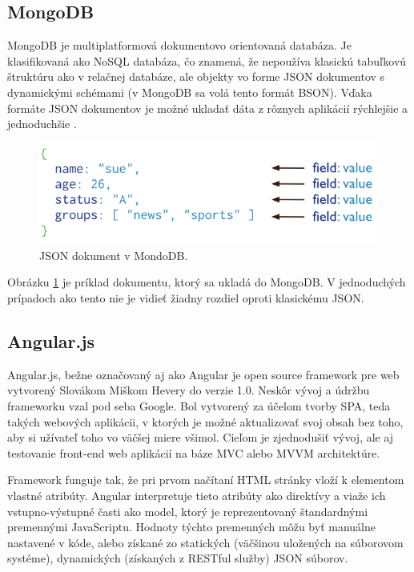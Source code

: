 \subsection{MongoDB}
MongoDB je multiplatformová dokumentovo orientovaná databáza. Je klasifikovaná ako NoSQL databáza, čo znamená, že nepoužíva klasickú tabuľkovú štruktúru ako v relačnej databáze, ale objekty vo forme JSON dokumentov s dynamickými schémami (v MongoDB sa volá tento formát BSON). Vďaka formáte JSON dokumentov je možné ukladať dáta z rôznych aplikácií rýchlejšie a jednoduchšie \cite{mongodb-wiki}.

\begin{figure}[H]
  \centering
  \includegraphics[scale=0.7]{img/mongodb/crud-annotated-document.png}
  \caption{JSON dokument v MondoDB.}
  \label{mongodb-example}
\end{figure}

Obrázku \ref{mongodb-example} je príklad dokumentu, ktorý sa ukladá do MongoDB. V jednoduchých prípadoch ako tento nie je vidieť žiadny rozdiel oproti klasickému JSON.

\subsection{Angular.js}
Angular.js, bežne označovaný aj ako Angular je open source framework pre web vytvorený Slovákom Miškom Hevery do verzie 1.0. Neskôr vývoj a údržbu frameworku vzal pod seba Google. Bol vytvorený za účelom tvorby SPA, teda takých webových aplikácii, v ktorých je možné aktualizovať svoj obsah bez toho, aby si užívateľ toho vo väčšej miere všimol. Cieľom je zjednodušiť vývoj, ale aj testovanie front-end web aplikácií na báze MVC alebo MVVM architektúre.

Framework funguje tak, že pri prvom načítaní HTML stránky vloží k elementom vlastné atribúty. Angular interpretuje tieto atribúty ako direktívy a viaže ich vstupno-výstupné časti ako model, ktorý je reprezentovaný štandardnými premennými JavaScriptu. Hodnoty týchto premenných môžu byť manuálne nastavené v kóde, alebo získané zo statických (väčšinou uložených na súborovom systéme), dynamických (získaných z RESTful služby) JSON súborov.

